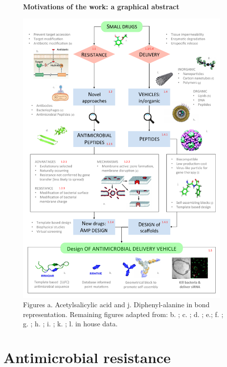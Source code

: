 \begin{figure}[p!]
\begin{center}
\Large{\textbf{Motivations of the work: a graphical abstract}}\par\bigskip
\includegraphics[width = 0.95\textwidth]{1introduction/pics/scheme_intro}
\caption[Graphical abstract of introduction]{Figures a. Acetylsalicylic acid and j. Diphenyl-alanine in bond representation. Remaining figures adapted from: b. \citep{Blair2014}; c. \citep{phage}; d. \citep{Torres2019}; e.\citep{Nguyen2011}; f. \citep{nanotube}; g. \citep{poly}; h. \citep{lipo}; i. \citep{Schoonen2014}; k. \citep{Castelletto2016}; l. in house data.} \label{fig:intro}
\end{center}
\end{figure}


\section{Antimicrobial resistance}

